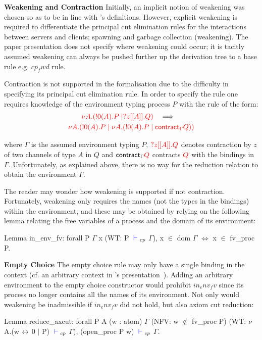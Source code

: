 \textbf{Weakening and Contraction} Initially, an implicit notion of weakening
was chosen so as to be in line with \citeauthor{Wadler:2014}'s
definitions. However, explicit weakening is required to differentiate the
principal cut elimination rules for the interactions between servers and
clients; spawning and garbage collection (weakening). The paper presentation
does not specify where weakening could occur; it is tacitly assumed weakening
can always be pushed further up the derivation tree to a base rule
e.g. \coqe$cp_fwd$ rule.

\begin{samepage}
Contraction is not supported in the formalisation due to the difficulty in
specifying its principal cut elimination rule.  In order to specify the rule
one requires knowledge of the environment typing process \coqe$P$ with the
rule of the form:
\begin{gather*}
{\color{red}\nu A.(!0(A).P \mid ?z[[A]].Q)}
\quad \Longrightarrow \quad \\
{\color{red} \nu A.(!0(A).P \mid \nu A.(!0(A).P \mid \textsf{contract}_{\Gamma} Q))}
\end{gather*}

where $\Gamma$ is the assumed environment typing \coqe$P$, ${\color{red} ?z[[A]].Q}$
denotes contraction by $z$ of two channels of type $A$ in $Q$ and
$\textsf{contract}_{\Gamma} {\color{red} Q}$ contracts ${\color{red} Q}$ with the bindings in
$\Gamma$. Unfortunately, as explained above, there is no way for the reduction
relation to obtain the environment $\Gamma$.
\end{samepage}

The reader may wonder how weakening is supported if not
contraction. Fortunately, weakening only requires the names (not the types in
the bindings) within the environment, and these may be obtained by relying on
the following lemma relating the free variables of a process and the domain of
its environment:
\begin{coq}
Lemma in_env_fv:
  forall P $\Gamma$ x (WT: P ${\color{blue} {} \vdash {}}_{cp}$ $\Gamma$),
    x $\in$ dom $\Gamma$ $\iff$ x $\in$ fv_proc P.
\end{coq}

\textbf{Empty Choice} The empty choice rule may only have a single binding in
the context (cf. an arbitrary context in \citeauthor{Wadler:2014}'s
presentation~\cite{Wadler:2014}). Adding an arbitrary environment to the empty
choice constructor would prohibit \coqe$in_env_fv$ since its process no longer
contains all the names of its environment. Not only would weakening be
inadmissible if \coqe$in_env_fv$ did not hold, but also axiom cut reduction:
\begin{coq}
Lemma reduce_axcut:
  forall P A (w : atom) $\Gamma$
         (NFV: w $\notin$ fv_proc P)
         (WT: $\nu$ A.(w ${\leftrightarrow}$ 0 $\mid$ P) ${\color{blue} {} \vdash {}}_{cp}$ $\Gamma$),
    (open_proc P w) ${\color{blue} {} \vdash {}}_{cp}$ $\Gamma$.
\end{coq}

